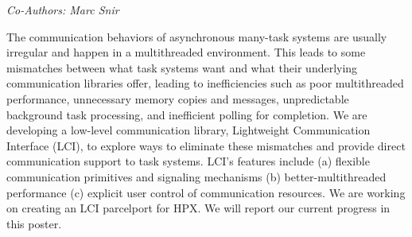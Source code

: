 \begin{center}
\textit{Co-Authors: Marc Snir }
\end{center} 
The communication behaviors of asynchronous many-task systems are usually irregular and happen in a multithreaded environment. This leads to some mismatches between what task systems want and what their underlying communication libraries offer, leading to inefficiencies such as poor multithreaded performance, unnecessary memory copies and messages, unpredictable background task processing, and inefficient polling for completion.
We are developing a low-level communication library, Lightweight Communication Interface (LCI), to explore ways to eliminate these mismatches and provide direct communication support to task systems. LCI’s features include (a) flexible communication primitives and signaling mechanisms (b) better-multithreaded performance (c) explicit user control of communication resources.
We are working on creating an LCI parcelport for HPX. We will report our current progress in this poster. 